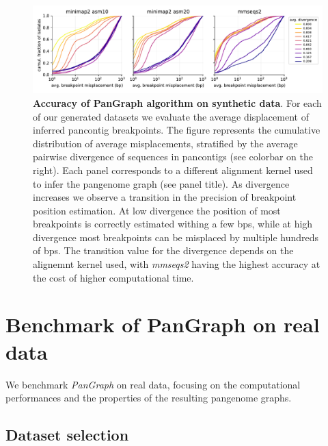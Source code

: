 \documentclass[aps,rmp,reprint,superscriptaddress,notitlepage,10pt,onecolumn]{revtex4-1}
\begin{document}
\begin{figure}[htb]
    \includegraphics[width=\textwidth]{figs_suppl/accuracy_comparison.pdf}
    \caption{{\bf Accuracy of PanGraph algorithm on synthetic data}. For each of our generated datasets we evaluate the average displacement of inferred pancontig breakpoints. The figure represents the cumulative distribution of average misplacements, stratified by the average pairwise divergence of sequences in pancontigs (see colorbar on the right). Each panel corresponds to a different alignment kernel used to infer the pangenome graph (see panel title). As divergence increases we observe a transition in the precision of breakpoint position estimation. At low divergence the position of most breakpoints is correctly estimated withing a few bps, while at high divergence most breakpoints can be misplaced by multiple hundreds of bps. The transition value for the divergence depends on the alignemnt kernel used, with \textit{mmseqs2} having the highest accuracy at the cost of higher computational time.}
    \label{fig:benchmark-accuracy-suppl}
\end{figure}

\section{Benchmark of PanGraph on real data}

We benchmark \textit{PanGraph} on real data, focusing on the computational performances and the properties of the resulting pangenome graphs.

\subsection{Dataset selection}
\end{document}
